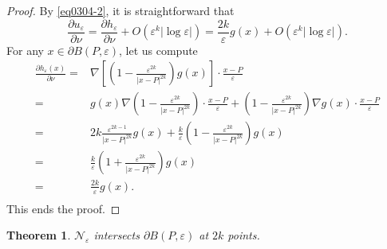 \documentclass[11pt,reqno]{article}
\newtheorem{teo}{Theorem}[section]
\numberwithin{equation}{section}
\newcommand\e\varepsilon
\begin{document}
\begin{proof}
   By \eqref{eq0304-2}, it is  straightforward  that
    \begin{equation}
        \frac{\partial u_\e}{\partial\nu}=\frac{\partial h_\e}{\partial\nu}+O(\e^{k}|\log\e|)=\frac{2k}{\e}g(x)+O(\e^{k}|\log\e|).
    \end{equation}
   For any $x\in \partial B(P,\e)$,  let us compute
    \begin{equation}
        \begin{aligned}
            \frac{\partial h_\e(x)}{\partial\nu}=&\nabla\left[\left(1-\frac{\e^{2k}}{|x-P|^{2k}}\right)g(x)\right]\cdot \frac{x-P}{\e}\\
            =&g(x)\nabla\left(1-\frac{\e^{2k}}{|x-P|^{2k}}\right)\cdot \frac{x-P}{\e}+\left(1-\frac{\e^{2k}}{|x-P|^{2k}}\right)\nabla g(x)\cdot \frac{x-P}{\e}\\
            =&2k\frac{\e^{2k-1}}{|x-P|^{2k}}g(x)+\frac{k}{\e}\left(1-\frac{\e^{2k}}{|x-P|^{2k}}\right)g(x)\\
            =&\frac{k}{\e}\left(1+\frac{\e^{2k}}{|x-P|^{2k}}\right)g(x)\\
            =&\frac{2k}{\e}g(x).\\
        \end{aligned}
    \end{equation}
     This ends the proof.
     \end{proof}
      \begin{teo}\label{apmain}
        $\mathcal{N}_{\e}$  intersects $\partial B(P,\e)$ at $2k$ points.
    \end{teo}
\end{document}

